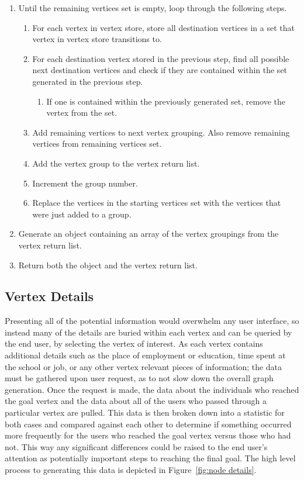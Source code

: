 \begin{enumerate}
   \item Until the remaining vertices set is empty, loop through the following
   steps.
   \begin{enumerate}
     \item For each vertex in vertex store, store all destination vertices in a
     set that vertex in vertex store transitions to.
     \item For each destination vertex stored in the previous step, find all
     possible next destination vertices and check if they are contained within
     the set generated in the previous step.
     \begin{enumerate}
       \item If one is contained within the previously generated set, remove
       the vertex from the set.
     \end{enumerate}
     \item Add remaining vertices to next vertex grouping.  Also remove remaining
     vertices from remaining vertices set.
     \item Add the vertex group to the vertex return list.
     \item Increment the group number.
     \item Replace the vertices in the starting vertices set with the vertices
     that were just added to a group.
   \end{enumerate} 
   \item Generate an object containing an array of the vertex groupings from
   the vertex return list.
   \item Return both the object and the vertex return list.
 \end{enumerate}



\subsection{Vertex Details}
Presenting all of the potential information would overwhelm any user interface,
so instead many of the details are buried within each vertex and can be queried
by the end user, by selecting the vertex of interest.  As each vertex contains
additional details such as the place of employment or education, time spent at
the school or job, or any other vertex relevant pieces of information; the data
must be gathered upon user request, as to not slow down the overall graph
generation.  Once the request is made, the data about the individuals who
reached the goal vertex and the data about all of the users who passed through a
particular vertex are pulled.  This data is then broken down into a statistic for
both cases and compared against each other to determine if something occurred
more frequently for the users who reached the goal vertex versus those who had
not.  This way any significant differences could be raised to the end user's
attention as potentially important steps to reaching the final goal.  The high
level process to generating this data is depicted in Figure~\ref{fig:node
details}.

